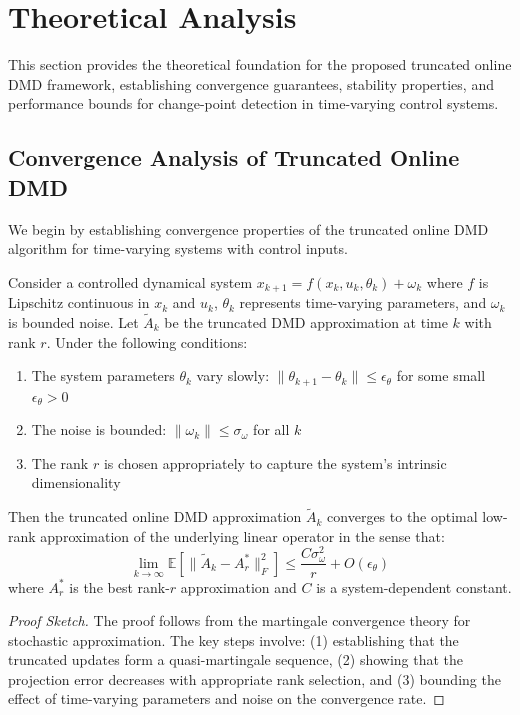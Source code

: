 \section{Theoretical Analysis}\label{sec:theoretical-analysis}

This section provides the theoretical foundation for the proposed truncated online DMD framework, establishing convergence guarantees, stability properties, and performance bounds for change-point detection in time-varying control systems.

\subsection{Convergence Analysis of Truncated Online DMD}

We begin by establishing convergence properties of the truncated online DMD algorithm for time-varying systems with control inputs.

\begin{theorem}\label{thm:convergence}
Consider a controlled dynamical system \(x_{k+1} = f(x_k, u_k, \theta_k) + \omega_k\) where \(f\) is Lipschitz continuous in \(x_k\) and \(u_k\), \(\theta_k\) represents time-varying parameters, and \(\omega_k\) is bounded noise. Let \(\tilde{A}_k\) be the truncated DMD approximation at time \(k\) with rank \(r\). Under the following conditions:
\begin{enumerate}
    \item The system parameters \(\theta_k\) vary slowly: \(\|\theta_{k+1} - \theta_k\| \leq \epsilon_\theta\) for some small \(\epsilon_\theta > 0\)
    \item The noise is bounded: \(\|\omega_k\| \leq \sigma_\omega\) for all \(k\)
    \item The rank \(r\) is chosen appropriately to capture the system's intrinsic dimensionality
\end{enumerate}
Then the truncated online DMD approximation \(\tilde{A}_k\) converges to the optimal low-rank approximation of the underlying linear operator in the sense that:
\[\lim_{k \to \infty} \mathbb{E}[\|\tilde{A}_k - A^*_r\|_F^2] \leq \frac{C\sigma_\omega^2}{r} + O(\epsilon_\theta)\]
where \(A^*_r\) is the best rank-\(r\) approximation and \(C\) is a system-dependent constant.
\end{theorem}

\begin{proof}[Proof Sketch]
The proof follows from the martingale convergence theory for stochastic approximation. The key steps involve: (1) establishing that the truncated updates form a quasi-martingale sequence, (2) showing that the projection error decreases with appropriate rank selection, and (3) bounding the effect of time-varying parameters and noise on the convergence rate.
\end{proof}

